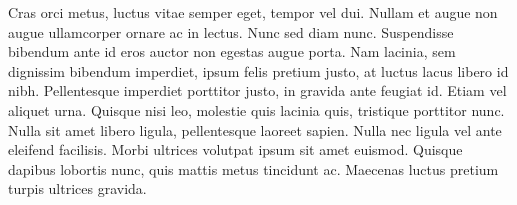 Cras orci metus, luctus vitae semper eget, tempor vel dui. Nullam et augue non
augue ullamcorper ornare ac in lectus. Nunc sed diam nunc. Suspendisse bibendum
ante id eros auctor non egestas augue porta. Nam lacinia, sem dignissim
bibendum imperdiet, ipsum felis pretium justo, at luctus lacus libero id nibh.
Pellentesque imperdiet porttitor justo, in gravida ante feugiat id. Etiam vel
aliquet urna. Quisque nisi leo, molestie quis lacinia quis, tristique porttitor
nunc. Nulla sit amet libero ligula, pellentesque laoreet sapien. Nulla nec
ligula vel ante eleifend facilisis. Morbi ultrices volutpat ipsum sit amet
euismod. Quisque dapibus lobortis nunc, quis mattis metus tincidunt ac.
Maecenas luctus pretium turpis ultrices gravida.
